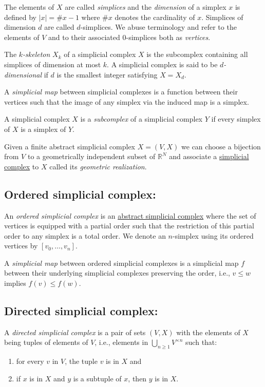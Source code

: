 \documentclass{amsart}
\begin{document}
	The elements of $X$ are called \textit{simplices} and the \textit{dimension} of a simplex $x$ is defined by $|x| = \# x - 1$ where $\# x$ denotes the cardinality of $x$. Simplices of dimension $d$ are called $d$-simplices. We abuse terminology and refer to the elements of $V$ and to their associated $0$-simplices both as \textit{vertices}.
	
	The \textit{$k$-skeleton }$X_k$ of a simplicial complex $X$ is the subcomplex containing all simplices of dimension at most $k$. A simplicial complex is said to be \textit{$d$-dimensional} if $d$ is the smallest integer satisfying $X = X_d$.
	
	A \textit{simplicial map} between simplicial complexes is a function between their vertices such that the image of any simplex via the induced map is a simplex.
	
	A simplicial complex $X$ is a \textit{subcomplex} of a simplicial complex $Y$ if every simplex of $X$ is a simplex of $Y$.
	
	Given a finite abstract simplicial complex $X = (V, X)$ we can choose a bijection from $V$ to a geometrically independent subset of $\mathbb R^N$ and associate a \hyperref[simplicial complex]{simplicial complex} to $X$ called its \textit{geometric realization}.
	
	\subsection*{Ordered simplicial complex:} \label{ordered simplical complex}
	
	An \textit{ordered simplicial complex} is an \hyperref[abstract simplicial complex]{abstract simplicial complex} where the set of vertices is equipped with a partial order such that the restriction of this partial order to any simplex is a total order. We denote an $n$-simplex using its ordered vertices by $[v_0, \dots, v_n]$.
	
	A \textit{simplicial map} between ordered simplicial complexes is a simplicial map $f$ between their underlying simplicial complexes preserving the order, i.e., $v \leq w$ implies $f(v) \leq f(w)$.
	
	\subsection*{Directed simplicial complex:} \label{directed simplicial complex}
	
	A \textit{directed simplicial complex} is a pair of sets $(V, X)$ with the elements of $X$ being tuples of elements of $V$, i.e., elements in $\bigcup_{n\geq1} V^{\times n}$ such that: 
	\begin{enumerate}
		\item for every $v$ in $V$, the tuple $v$ is in $X$ and
		\item if $x$ is in $X$ and $y$ is a subtuple of $x$, then $y$ is in $X$. 
	\end{enumerate}
	
\end{document}
